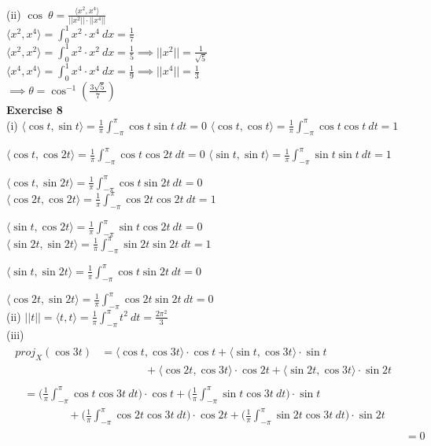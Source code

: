 \documentclass[letterpaper,12pt]{article}
\theoremstyle{definition}
\begin{document}
(ii) $\cos \ \theta = \frac{\langle x^2, x^4 \rangle}{||x^2|| \cdot ||x^4||}$ \\
$\langle x^2, x^4 \rangle = \int_0^1 x^2 \cdot x^4 \ dx = \frac{1}{7}$ \\
$\langle x^2, x^2 \rangle = \int_0^1 x^2 \cdot x^2 \ dx = \frac{1}{5} \implies ||x^2|| = \frac{1}{\sqrt{5}}$ \\
$\langle x^4, x^4 \rangle = \int_0^1 x^4 \cdot x^4 \ dx = \frac{1}{9} \implies ||x^4|| = \frac{1}{3}$ \\
$\implies \theta = \cos^{-1} (\frac{3\sqrt{5}}{7})$ \\

\textbf{Exercise 8} \\
(i) $\langle \cos t, \sin t \rangle = \frac{1}{\pi} \int_{-\pi}^\pi \cos t \sin t \ dt = 0$
\qquad $\langle \cos t, \cos t \rangle = \frac{1}{\pi} \int_{-\pi}^\pi \cos t \cos t \ dt = 1$

$\langle \cos t, \cos 2t \rangle = \frac{1}{\pi} \int_{-\pi}^\pi \cos t \cos 2t \ dt = 0$
\qquad $\langle \sin t, \sin t \rangle = \frac{1}{\pi} \int_{-\pi}^\pi \sin t \sin t \ dt = 1$

$\langle \cos t, \sin 2t \rangle = \frac{1}{\pi} \int_{-\pi}^\pi \cos t \sin 2t \ dt = 0$
\qquad $\langle \cos 2t, \cos 2t \rangle = \frac{1}{\pi} \int_{-\pi}^\pi \cos 2t \cos 2t \ dt = 1$

$\langle \sin t, \cos 2t \rangle = \frac{1}{\pi} \int_{-\pi}^\pi \sin t \cos 2t \ dt = 0$
\qquad $\langle \sin 2t, \sin 2t \rangle = \frac{1}{\pi} \int_{-\pi}^\pi \sin 2t \sin 2t \ dt = 1$

$\langle \sin t, \sin 2t \rangle = \frac{1}{\pi} \int_{-\pi}^\pi \cos t \sin 2t \ dt = 0$

$\langle \cos 2t, \sin 2t \rangle = \frac{1}{\pi} \int_{-\pi}^\pi \cos 2t \sin 2t \ dt = 0$ \\

(ii) $||t|| = \langle t, t \rangle = \frac{1}{\pi} \int_{-\pi}^\pi t^2 \ dt = \frac{2\pi^2}{3}$ \\

(iii)
\begin{align*}
  \begin{split}
    proj_X(\cos 3t) &= \langle \cos t, \cos 3t \rangle \cdot \cos t + \langle \sin t, \cos 3t \rangle \cdot \sin t \\
    & \qquad \qquad + \langle \cos 2t, \cos 3t \rangle \cdot \cos 2t + \langle \sin 2t, \cos 3t \rangle \cdot \sin 2t
  \end{split} \\
  \begin{split}
    &= \Big(\frac{1}{\pi} \int_{-\pi}^\pi \cos t \cos 3t \ dt \Big) \cdot \cos t +
    \Big(\frac{1}{\pi} \int_{-\pi}^\pi \sin t \cos 3t \ dt \Big) \cdot \sin t \\
    & \qquad \qquad + \Big(\frac{1}{\pi} \int_{-\pi}^\pi \cos 2t \cos 3t \ dt \Big) \cdot \cos 2t +
    \Big(\frac{1}{\pi} \int_{-\pi}^\pi \sin 2t \cos 3t \ dt \Big) \cdot \sin 2t
  \end{split} \\
  &= 0
\end{align*}
\end{document}
